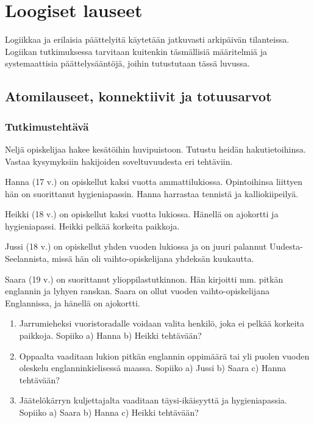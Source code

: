 \chapter{Loogiset lauseet}

Logiikkaa ja erilaisia päättelyitä käytetään jatkuvasti arkipäivän tilanteissa. Logiikan tutkimuksessa tarvitaan kuitenkin täsmällisiä mää\-ri\-tel\-miä ja systemaattisia päättelysääntöjä, joihin tutustutaan tässä luvussa.

\section{Atomilauseet, konnektiivit ja totuusarvot}
\label{konnektiivit}

\subsection*{Tutkimustehtävä}
Neljä opiskelijaa hakee kesätöihin huvipuistoon. Tutustu heidän hakutietoihinsa. Vastaa kysymyksiin hakijoiden soveltuvuudesta eri tehtäviin.

Hanna (17 v.) on opiskellut kaksi vuotta ammattilukiossa. Opintoihinsa liittyen hän on suorittanut hygieniapassin. Hanna harrastaa tennistä ja kalliokiipeilyä.

Heikki (18 v.) on opiskellut kaksi vuotta lukiossa. Hänellä on ajokortti ja hygieniapassi. Heikki pelkää korkeita paikkoja.

Jussi (18 v.) on opiskellut yhden vuoden lukiossa ja on juuri palannut Uudesta-Seelannista, missä hän oli vaihto-opiskelijana yhdeksän kuukautta.

Saara (19 v.) on suorittanut ylioppilastutkinnon. Hän kirjoitti mm. pitkän englannin ja lyhyen ranskan. Saara on ollut vuoden vaihto-opiskelijana Englannissa, ja hänellä on ajokortti.

\begin{enumerate}
\item Jarrumieheksi vuoristoradalle voidaan valita henkilö, joka ei pelkää korkeita paikkoja. Sopiiko a) Hanna b) Heikki teh\-tä\-vään?
\item Oppaalta vaaditaan lukion pitkän englannin oppimäärä tai yli puolen vuoden oleskelu englanninkielisessä maassa. Sopiiko a) Jussi b) Saara c) Hanna tehtävään?
\item Jäätelökärryn kuljettajalta vaaditaan täysi-ikäisyyttä ja hygieniapassia. Sopiiko a) Saara b) Hanna c) Heikki tehtävään?
\end{enumerate}

